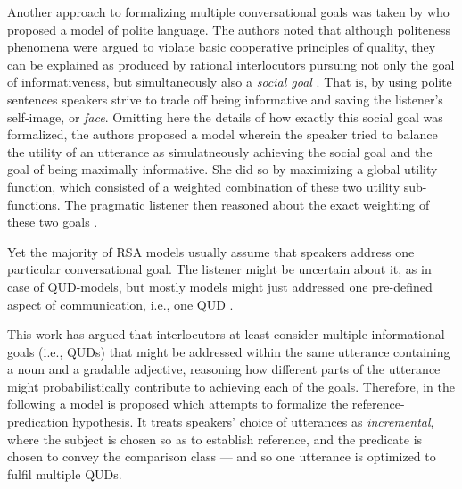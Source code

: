 Another approach to formalizing multiple conversational goals was taken by \textcite{yoon2016talking} who proposed a model of polite language. The authors noted that although politeness phenomena were argued to violate basic cooperative principles of quality, they can be explained as produced by rational interlocutors pursuing not only the goal of informativeness, but simultaneously also a \emph{social goal} \parencite[cf.][]{brown1987politeness, yoon2016talking}. That is, by using polite sentences speakers strive to trade off being informative and saving the listener's self-image, or \emph{face}. Omitting here the details of how exactly this social goal was formalized, the authors proposed a model wherein the speaker tried to balance the utility of an utterance as simulatneously achieving the social goal and the goal of being maximally informative. She did so by maximizing a global utility function, which consisted of a weighted combination of these two utility sub-functions. The pragmatic listener then reasoned about the exact weighting of these two goals \parencite{yoon2016talking}. 

Yet the majority of RSA models usually assume that speakers address one particular conversational goal. The listener might be uncertain about it, as in case of QUD-models, but mostly models might just addressed one pre-defined aspect of communication, i.e., one QUD \parencite[see][for an overview of various RSA models]{problang}. 

This work has argued that interlocutors at least consider multiple informational goals (i.e., QUDs) that might be addressed within the same utterance containing a noun and a gradable adjective, reasoning how different parts of the utterance might probabilistically contribute to achieving each of the goals. Therefore, in the following a model is proposed which attempts to formalize the reference-predication hypothesis. It treats speakers' choice of utterances as \emph{incremental}, where the subject is chosen so as to establish reference, and the predicate is chosen to convey the comparison class --- and so one utterance is optimized to fulfil multiple QUDs. 

